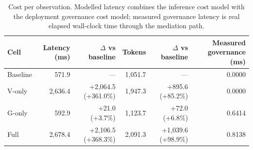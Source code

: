 \begin{table}[htbp]
\centering
\small
\caption{Cost per observation. Modelled latency combines the inference cost model with the deployment governance cost model; measured governance latency is real elapsed wall-clock time through the mediation path.}
\label{tab:gmais-3}
\begin{tabular}{lrrrrr}
\toprule
Cell & Latency (ms) & $\Delta$ vs baseline & Tokens & $\Delta$ vs baseline & Measured governance (ms) \\
\midrule
Baseline & 571.9 & --- & 1,051.7 & --- & 0.0000 \\
V-only & 2,636.4 & +2,064.5  (+361.0\%) & 1,947.3 & +895.6  (+85.2\%) & 0.0000 \\
G-only & 592.9 & +21.0  (+3.7\%) & 1,123.7 & +72.0  (+6.8\%) & 0.6414 \\
Full & 2,678.4 & +2,106.5  (+368.3\%) & 2,091.3 & +1,039.6  (+98.9\%) & 0.8138 \\
\bottomrule
\end{tabular}
\end{table}
